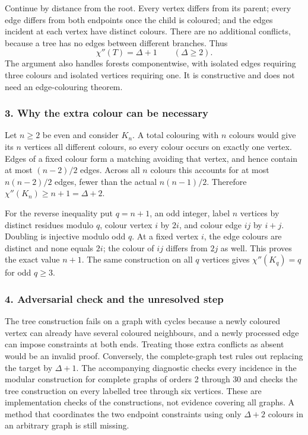 \documentclass[11pt,a4paper]{article}
\begin{document}
Continue by distance from the root. Every vertex differs from its parent; every edge differs from both endpoints once the child is coloured; and the edges incident at each vertex have distinct colours. There are no additional conflicts, because a tree has no edges between different branches. Thus
\[\chi''(T)=\Delta+1\qquad(\Delta\geq2).\]
The argument also handles forests componentwise, with isolated edges requiring three colours and isolated vertices requiring one. It is constructive and does not need an edge-colouring theorem.

\subsubsection{3. Why the extra colour can be necessary}
Let $n\geq2$ be even and consider $K_n$. A total colouring with $n$ colours would give its $n$ vertices all different colours, so every colour occurs on exactly one vertex. Edges of a fixed colour form a matching avoiding that vertex, and hence contain at most $(n-2)/2$ edges. Across all $n$ colours this accounts for at most $n(n-2)/2$ edges, fewer than the actual $n(n-1)/2$. Therefore $\chi''(K_n)\geq n+1=\Delta+2$.

For the reverse inequality put $q=n+1$, an odd integer, label $n$ vertices by distinct residues modulo $q$, colour vertex $i$ by $2i$, and colour edge $ij$ by $i+j$. Doubling is injective modulo odd $q$. At a fixed vertex $i$, the edge colours are distinct and none equals $2i$; the colour of $ij$ differs from $2j$ as well. This proves the exact value $n+1$. The same construction on all $q$ vertices gives $\chi''(K_q)=q$ for odd $q\geq3$.

\subsubsection{4. Adversarial check and the unresolved step}
The tree construction fails on a graph with cycles because a newly coloured vertex can already have several coloured neighbours, and a newly processed edge can impose constraints at both ends. Treating those extra conflicts as absent would be an invalid proof. Conversely, the complete-graph test rules out replacing the target by $\Delta+1$. The accompanying diagnostic checks every incidence in the modular construction for complete graphs of orders 2 through 30 and checks the tree construction on every labelled tree through six vertices. These are implementation checks of the constructions, not evidence covering all graphs. A method that coordinates the two endpoint constraints using only $\Delta+2$ colours in an arbitrary graph is still missing.
\end{document}
